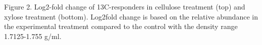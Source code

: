 Figure 2. Log2-fold change of 13C-responders in cellulose treatment (top) and xylose treatment (bottom). Log2fold change is based on the relative abundance in the experimental treatment compared to the control with the density range 1.7125-1.755 g/ml.